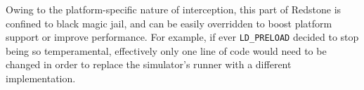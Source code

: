 {Owing to the platform-specific nature of interception,
this part of Redstone is confined to black magic jail,
and can be easily overridden to boost platform support or improve performance.
For example,
if ever \texttt{LD\_PRELOAD} decided to stop being so temperamental,
effectively only one line of code would need to be changed in order to replace the simulator’s runner with a different implementation.

}

% 

